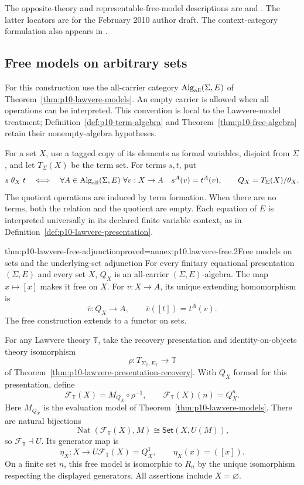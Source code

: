 The opposite-theory and representable-free-model descriptions are
\cite[1963 thesis, Chapter~III, \S1, pp.~74--75;
1968 article, \S1, p.~110]{Lawvere2004FunctorialReprint} and
\cite[Remark~11.21 and Corollary~11.22, pp.~102--103]{AdamekRosickyVitale2010Draft}.
The latter locators are for the February 2010 author draft.
The context-category formulation also appears in
\cite[Remark~4.2.3, p.~33]{Pitts1995Draft}.

\subsection{Free models on arbitrary sets}
\label{sec:p10-lawvere-free-adjunction}

For this construction use the all-carrier category
\(\operatorname{Alg}_{\rm all}(\Sigma,E)\) of
Theorem~\ref{thm:p10-lawvere-models}.
An empty carrier is allowed when all operations can be interpreted.
This convention is local to the Lawvere-model treatment;
Definition~\ref{def:p10-term-algebra} and
Theorem~\ref{thm:p10-free-algebra} retain their nonempty-algebra hypotheses.

For a set \(X\), use a tagged copy of its elements as formal variables,
disjoint from \(\Sigma\), and let \(T_\Sigma(X)\) be the term set.
For terms \(s,t\), put
\[
 s\mathrel{\theta_X}t
 \quad\Longleftrightarrow\quad
 \forall A\in\operatorname{Alg}_{\rm all}(\Sigma,E)\
 \forall v:X\to A\quad s^A(v)=t^A(v),
 \qquad Q_X=T_\Sigma(X)/\theta_X.
\]
The quotient operations are induced by term formation.
When there are no terms, both the relation and the quotient are empty.
Each equation of \(E\) is interpreted universally in its declared
finite variable context, as in Definition~\ref{def:p10-lawvere-presentation}.

\begin{hbtheorem}{thm:p10-lawvere-free-adjunction}{proved=annex:p10.lawvere-free.2}{Free models on sets and the underlying-set adjunction}
For every finitary equational presentation \((\Sigma,E)\) and every
set \(X\), \(Q_X\) is an all-carrier \((\Sigma,E)\)-algebra.
The map \(x\mapsto[x]\) makes it free on \(X\).
For \(v:X\to A\), its unique extending homomorphism is
\[
 \bar v:Q_X\longrightarrow A,\qquad \bar v([t])=t^A(v).
\]
The free construction extends to a functor on sets.

For any Lawvere theory \(\mathbb T\), take the recovery presentation
and identity-on-objects theory isomorphism
\[
 \rho:T_{\Sigma_{\mathbb T},E_{\mathbb T}}\longrightarrow\mathbb T
\]
of Theorem~\ref{thm:p10-lawvere-presentation-recovery}.
With \(Q_X\) formed for this presentation, define
\[
 \mathcal F_{\mathbb T}(X)=M_{Q_X}\circ\rho^{-1},
 \qquad \mathcal F_{\mathbb T}(X)(n)=Q_X^n.
\]
Here \(M_{Q_X}\) is the evaluation model of
Theorem~\ref{thm:p10-lawvere-models}.
There are natural bijections
\[
 \operatorname{Nat}(\mathcal F_{\mathbb T}(X),M)
       \cong\mathsf{Set}(X,U(M)),
\]
so \(\mathcal F_{\mathbb T}\dashv U\).
Its generator map is
\[
 \eta_X:X\longrightarrow U\mathcal F_{\mathbb T}(X)=Q_X^1,
 \qquad \eta_X(x)=([x]).
\]
On a finite set \(n\), this free model is isomorphic to \(R_n\)
by the unique isomorphism respecting the displayed generators.
All assertions include \(X=\varnothing\).
\end{hbtheorem}

